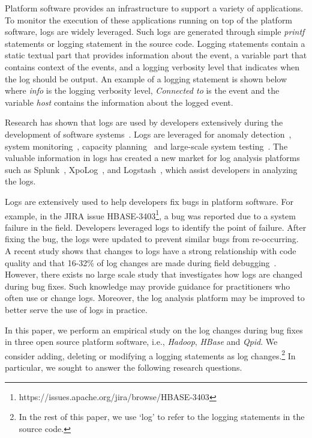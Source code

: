 Platform software provides an infrastructure to support a variety of applications. To monitor the execution of these applications
running on top of the platform software, logs are widely leveraged. Such logs are generated through simple \textsl{printf} statements or logging statement in the source code. Logging statements contain a static textual part that provides information about the event, a variable part that contains context of the events, and a logging verbosity level that indicates when the log should be output. An example of a logging statement is shown below where \emph{info} is the logging verbosity level, \emph{Connected to} is the event and the variable \emph{host} contains the information about the logged event. 



Research has shown that logs are used by developers extensively during the development of software systems~\cite{Characterizinglogs}. Logs are leveraged for anomaly detection~\cite{XUanomalies,ConsoleLogs,Marksyer}, system monitoring~\cite{Bitperformance}, capacity planning~\cite{IanWCRE} and large-scale system testing~\cite{markTesting}. The valuable information in logs has created a new market for log analysis platforms such as Splunk~\cite{Bitperformance}, XpoLog~\cite{Xpolog}, and Logstash~\cite{Logstash}, which assist developers in analyzing the logs.

 
Logs are extensively used to help developers fix bugs in platform software. For example, in the JIRA issue HBASE-3403\footnote{https://issues.apache.org/jira/browse/HBASE-3403}, a bug was reported due to a system failure in the field. Developers leveraged logs to identify the point of failure. After fixing the bug, the logs were updated to prevent similar bugs from re-occurring. A recent study shows that changes to logs have a strong relationship with code quality and that 16-32\%
of log changes are made during field debugging~\cite{EMSEIAN}. However, there exists no large scale study that investigates how logs are changed during bug fixes. Such knowledge may provide guidance for practitioners who often use or change logs. Moreover, the log analysis platform may be improved to better serve the use of logs in practice.

In this paper, we perform an empirical study on the log changes during bug fixes in three open source platform software, i.e., \emph{Hadoop}, \emph{HBase} and \emph{Qpid}. We consider adding, deleting or modifying a logging statements as log changes.\footnote{In the rest of this paper, we use `log' to refer to the logging statements in the source code.} In particular, we sought to answer the following research questions. 

